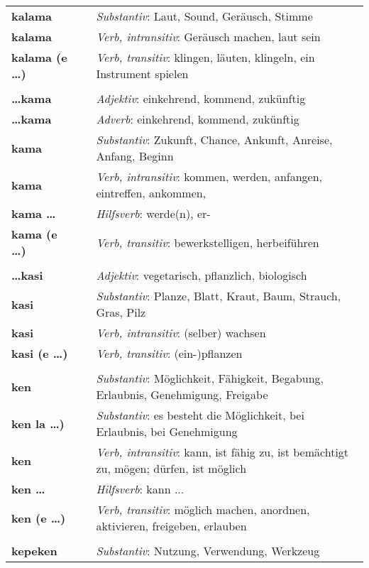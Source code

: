 \begin{supertabular}{p{2,5cm}|ll}
\textbf{kalama} && \textit{Substantiv}: Laut, Sound, Geräusch, Stimme \\ 
\textbf{kalama} && \textit{Verb, intransitiv}: Geräusch machen, laut sein \\ 
\textbf{kalama (e \dots)} && \textit{Verb, transitiv}: klingen, läuten, klingeln, ein Instrument spielen \\ 
 && \\ %
\textbf{\dots kama} && \textit{Adjektiv}: einkehrend, kommend, zukünftig \\ 
\textbf{\dots kama} && \textit{Adverb}: einkehrend, kommend, zukünftig \\ 
\textbf{kama} && \textit{Substantiv}:  Zukunft, Chance, Ankunft, Anreise, Anfang, Beginn \\ 
\textbf{kama} && \textit{Verb, intransitiv}: kommen, werden, anfangen, eintreffen, ankommen,  \\ 
\textbf{kama \dots} && \textit{Hilfsverb}: werde(n), er- \\ 
\textbf{kama (e \dots)} && \textit{Verb, transitiv}: bewerkstelligen, herbeiführen \\ 
 && \\ %
\textbf{\dots kasi} && \textit{Adjektiv}: vegetarisch, pflanzlich, biologisch \\ 
\textbf{kasi} && \textit{Substantiv}:  Planze, Blatt, Kraut, Baum, Strauch, Gras, Pilz \\ 
\textbf{kasi} && \textit{Verb, intransitiv}: (selber) wachsen \\ 
\textbf{kasi (e \dots)} && \textit{Verb, transitiv}: (ein-)pflanzen  \\ 
 && \\ %
\textbf{ken} && \textit{Substantiv}: Möglichkeit, Fähigkeit, Begabung, Erlaubnis, Genehmigung, Freigabe \\ 
\textbf{ken la \dots)} && \textit{Substantiv}: es besteht die Möglichkeit, bei Erlaubnis, bei Genehmigung \\ 
\textbf{ken} && \textit{Verb, intransitiv}: kann, ist fähig zu, ist bemächtigt zu, mögen; dürfen, ist möglich \\ 
\textbf{ken \dots} && \textit{Hilfsverb}: kann ... \\ 
\textbf{ken (e \dots)} && \textit{Verb, transitiv}:  möglich machen, anordnen, aktivieren, freigeben, erlauben \\ 
 && \\ %
\textbf{kepeken} && \textit{Substantiv}: Nutzung, Verwendung, Werkzeug \\ 

\end{supertabular}
